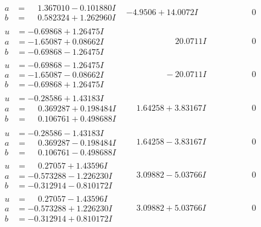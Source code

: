 \documentclass[1p]{elsarticle_modified}
\theoremstyle{definition}
\begin{document}
$$\begin{array}{c|c|c}
\begin{aligned}
a &= \phantom{-}1.367010 - 0.101880 I \\
b &= \phantom{-}0.582324 + 1.262960 I\end{aligned}
 & -4.9506 + 14.0072 I & \phantom{-0.000000 } 0 \\ \hline\begin{aligned}
u &= -0.69868 + 1.26475 I \\
a &= -1.65087 + 0.08662 I \\
b &= -0.69868 - 1.26475 I\end{aligned}
 & \phantom{-0.000000 -}20.0711 I & \phantom{-0.000000 } 0 \\ \hline\begin{aligned}
u &= -0.69868 - 1.26475 I \\
a &= -1.65087 - 0.08662 I \\
b &= -0.69868 + 1.26475 I\end{aligned}
 & \phantom{-0.000000 } -20.0711 I & \phantom{-0.000000 } 0 \\ \hline\begin{aligned}
u &= -0.28586 + 1.43183 I \\
a &= \phantom{-}0.369287 + 0.198484 I \\
b &= \phantom{-}0.106761 + 0.498688 I\end{aligned}
 & \phantom{-}1.64258 + 3.83167 I & \phantom{-0.000000 } 0 \\ \hline\begin{aligned}
u &= -0.28586 - 1.43183 I \\
a &= \phantom{-}0.369287 - 0.198484 I \\
b &= \phantom{-}0.106761 - 0.498688 I\end{aligned}
 & \phantom{-}1.64258 - 3.83167 I & \phantom{-0.000000 } 0 \\ \hline\begin{aligned}
u &= \phantom{-}0.27057 + 1.43596 I \\
a &= -0.573288 - 1.226230 I \\
b &= -0.312914 - 0.810172 I\end{aligned}
 & \phantom{-}3.09882 - 5.03766 I & \phantom{-0.000000 } 0 \\ \hline\begin{aligned}
u &= \phantom{-}0.27057 - 1.43596 I \\
a &= -0.573288 + 1.226230 I \\
b &= -0.312914 + 0.810172 I\end{aligned}
 & \phantom{-}3.09882 + 5.03766 I & \phantom{-0.000000 } 0 \\ \hline\begin{aligned}

\end{aligned}
\end{array}$$
\end{document}
